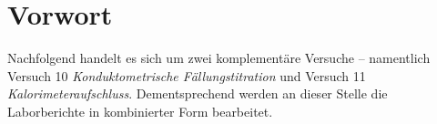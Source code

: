 \chapter{Vorwort}
	Nachfolgend handelt es sich um zwei komplementäre Versuche -- namentlich Versuch 10 \textit{Konduktometrische Fällungstitration}
	und Versuch 11 \textit{Kalorimeteraufschluss}. Dementsprechend werden an dieser Stelle die Laborberichte in kombinierter Form
	bearbeitet.